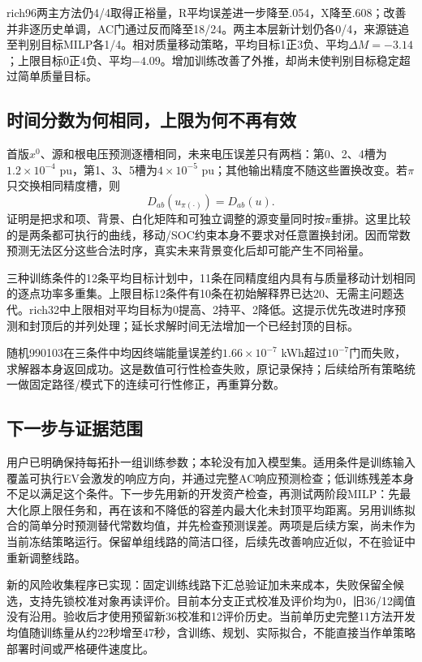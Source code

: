 \documentclass[UTF8,fontset=fandol,11pt,a4paper]{ctexart}
\begin{document}
rich96两主方法仍4/4取得正裕量，R平均误差进一步降至.054，X降至.608；改善并非逐历史单调，AC门通过反而降至18/24。两主本层新计划仍各0/4，来源链追至判别目标MILP各1/4。相对质量移动策略，平均目标1正3负、平均$\Delta M=-3.14$；上限目标0正4负、平均$-4.09$。增加训练改善了外推，却尚未使判别目标稳定超过简单质量目标。

\subsection{时间分数为何相同，上限为何不再有效}
首版$x^0$、源和根电压预测逐槽相同，未来电压误差只有两档：第0、2、4槽为$1.2\times10^{-4}$ pu，第1、3、5槽为$4\times10^{-5}$ pu；其他输出精度不随这些置换改变。若$\pi$只交换相同精度槽，则
\[
 D_{ab}(u_{\pi(\cdot)})=D_{ab}(u).
\]
证明是把求和项、背景、白化矩阵和可独立调整的源变量同时按$\pi$重排。这里比较的是两条都可执行的曲线，移动/SOC约束本身不要求对任意置换封闭。因而常数预测无法区分这些合法时序，真实未来背景变化后却可能产生不同裕量。

三种训练条件的12条平均目标计划中，11条在同精度组内具有与质量移动计划相同的逐点功率多重集。上限目标12条件有10条在初始解释界已达20、无需主问题迭代。rich32中上限相对平均目标为0提高、2持平、2降低。这提示优先改进时序预测和封顶后的并列处理；延长求解时间无法增加一个已经封顶的目标。

随机990103在三条件中均因终端能量误差约$1.66\times10^{-7}$ kWh超过$10^{-7}$门而失败，求解器本身返回成功。这是数值可行性检查失败，原记录保持；后续给所有策略统一做固定路径/模式下的连续可行性修正，再重算分数。

\subsection{下一步与证据范围}
用户已明确保持每拓扑一组训练参数；本轮没有加入模型集。适用条件是训练输入覆盖可执行EV会激发的响应方向，并通过完整AC响应预测检查；低训练残差本身不足以满足这个条件。下一步先用新的开发资产检查，再测试两阶段MILP：先最大化原上限任务和，再在该和不降低的容差内最大化未封顶平均距离。另用训练拟合的简单分时预测替代常数均值，并先检查预测误差。两项是后续方案，尚未作为当前冻结策略运行。保留单组线路的简洁口径，后续先改善响应近似，不在验证中重新调整线路。

新的风险收集程序已实现：固定训练线路下汇总验证加未来成本，失败保留全候选，支持先锁校准对象再读评价。目前本分支正式校准及评价均为0，旧36/12阈值没有沿用。验收后才使用预留新36校准和12评价历史。当前单历史完整11方法开发均值随训练量从约22秒增至47秒，含训练、规划、实际拟合，不能直接当作单策略部署时间或严格硬件速度比。
\end{document}
